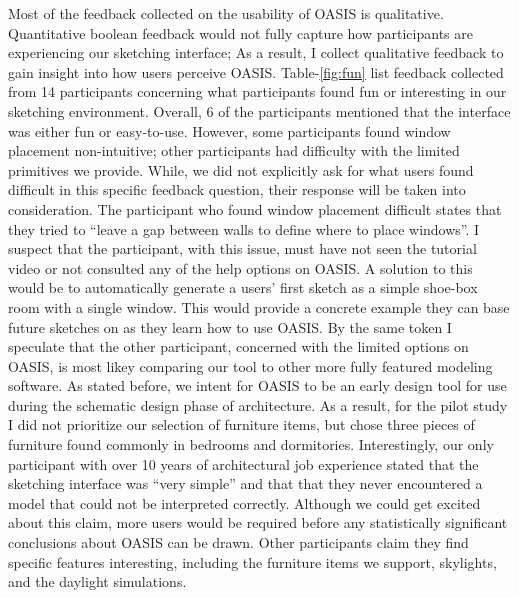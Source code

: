 Most of the feedback collected on the usability of OASIS is qualitative.
Quantitative boolean feedback would not fully capture how participants are experiencing our sketching interface;
As a result, I collect qualitative feedback to gain insight into how users perceive OASIS.
Table-\ref{fig:fun} list feedback collected from 14 participants concerning what participants found fun or interesting in our sketching environment.
Overall, 6 of the participants mentioned that the interface was either fun or easy-to-use.
However, some participants found window placement non-intuitive; 
other participants had difficulty with the limited primitives we provide.
While, we did not explicitly ask for what users found difficult in this specific feedback question, their response will be taken into consideration.
The participant who found window placement difficult states that they tried to ``leave a gap between walls to define where to place windows''.
I suspect that the participant, with this issue, must have not seen the tutorial video or not consulted any of the help options on OASIS.
A solution to this would be to automatically generate a users' first sketch as a simple shoe-box room with a single window. This would provide a concrete example they can base future sketches on as they learn how to use OASIS.
By the same token I speculate that the other participant, concerned with the limited options on OASIS, is most likey comparing our tool to other more fully featured modeling software.
As stated before, we intent for OASIS to be an early design tool for use during the schematic design phase of architecture.
As a result, for the pilot study I did not prioritize our selection of furniture items, but chose three pieces of furniture found commonly in bedrooms and dormitories.
Interestingly, our only participant with over 10 years of architectural job experience stated that the sketching interface was ``very simple'' and that that they never encountered a model that could not be interpreted correctly. Although we could get excited about this claim, more users would be required before any statistically significant conclusions about OASIS can be drawn.
Other participants claim they find specific features interesting, including the furniture items we support, skylights, and the daylight simulations.

